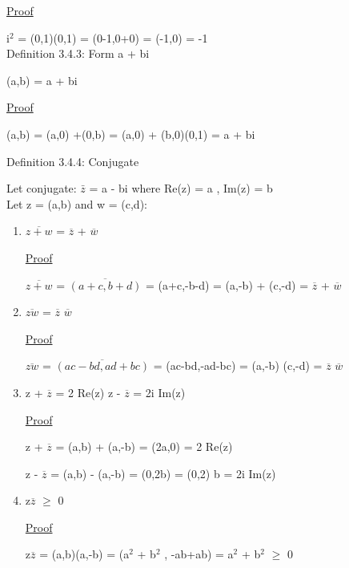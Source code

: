 { \color{magenta} \underline{Proof} } 
	
	i$^\text{2}$ = (0,1)(0,1) = (0-1,0+0) = (-1,0) = -1 \\

{ \color{blue} Definition 3.4.3: Form a + bi } 
	
	\qquad (a,b) = a + bi

{ \color{magenta} \underline{Proof} } 
	
	(a,b) = (a,0) +(0,b) = (a,0) + (b,0)(0,1) = a + bi \\

\newpage

{ \color{blue} Definition 3.4.4: Conjugate }
	
	\qquad Let conjugate: $\bar{z}$ = a - bi where Re(z) = a , Im(z) = b \\

	\qquad Let z = (a,b) and w = (c,d):
	\begin{enumerate}[label=(\alph*), leftmargin=2cm, itemsep=0.4em]
		\item $\overline{z+w}$ = $\overline{z}$ + $\overline{w}$

			{ \color{magenta} \underline{Proof} } 
			
				$\overline{z+w}$ = $\overline{(a+c,b+d)}$ = (a+c,-b-d)
				= (a,-b) + (c,-d) = $\overline{z}$ + $\overline{w}$

		\item $\overline{zw}$ = $\overline{z}$ $\overline{w}$

			{ \color{magenta} \underline{Proof} } 
			
				$\overline{zw}$ = $\overline{(ac-bd,ad+bc)}$ = (ac-bd,-ad-bc)
				= (a,-b) (c,-d) = $\overline{z}$ $\overline{w}$

		\item z + $\overline{z}$ = 2 Re(z) \qquad \qquad z - $\overline{z}$ = 2i Im(z)

			{ \color{magenta} \underline{Proof} } 
			
				z + $\overline{z}$ = (a,b) + (a,-b) = (2a,0) = 2 Re(z)

				z - $\overline{z}$ = (a,b) - (a,-b) = (0,2b) = (0,2) b = 2i Im(z)

		\item z$\overline{z}$ $\geq$ 0

			{ \color{magenta} \underline{Proof} } 
			
				z$\overline{z}$ = (a,b)(a,-b) = (a$^2$ + b$^2$ , -ab+ab)
				= a$^2$ + b$^2$ $\geq$ 0 \\
	\end{enumerate}

